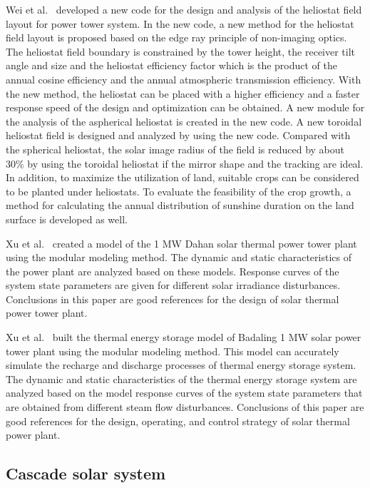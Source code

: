 Wei et al.~\cite{Wei2010a} developed a new code for the design and analysis of the heliostat field layout for power tower system. In the new code, a new method for the heliostat field layout is proposed based on the edge ray principle of non-imaging optics. The heliostat field boundary is constrained by the tower height, the receiver tilt angle and size and the heliostat efficiency factor which is the product of the annual cosine efficiency and the annual atmospheric transmission efficiency. With the new method, the heliostat can be placed with a higher efficiency and a faster response speed of the design and optimization can be obtained. A new module for the analysis of the aspherical heliostat is created in the new code. A new toroidal heliostat field is designed and analyzed by using the new code. Compared with the spherical heliostat, the solar image radius of the field is reduced by about 30\% by using the toroidal heliostat if the mirror shape and the tracking are ideal. In addition, to maximize the utilization of land, suitable crops can be considered to be planted under heliostats. To evaluate the feasibility of the crop growth, a method for calculating the annual distribution of sunshine duration on the land surface is developed as well.

Xu et al.~\cite{Xu2011a} created a model of the 1 MW Dahan solar thermal power tower plant using the modular modeling method. The dynamic and static characteristics of the power plant are analyzed based on these models. Response curves of the system state parameters are given for different solar irradiance disturbances. Conclusions in this paper are good references for the design of solar thermal power tower plant.

Xu et al.~\cite{Xu2012} built the thermal energy storage model of Badaling 1 MW solar power tower plant using the modular modeling method. This model can accurately simulate the recharge and discharge processes of thermal energy storage system. The dynamic and static characteristics of the thermal energy storage system are analyzed based on the model response curves of the system state parameters that are obtained from different steam flow disturbances. Conclusions of this paper are good references for the design, operating, and control strategy of solar thermal power plant.

\subsection{Cascade solar system}\label{sec:cs}

